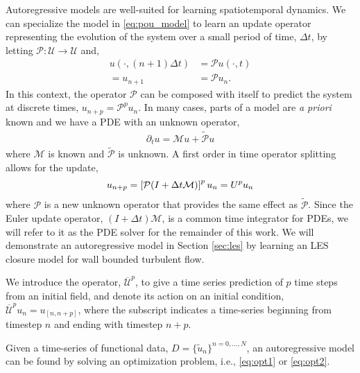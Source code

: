 Autoregressive models are well-suited for learning spatiotemporal dynamics. We can specialize the model in \eqref{eq:pou_model} to learn an update operator representing the evolution of the system over a small period of time, $\Delta t$, by letting $\mathcal{P}:\mathcal{U}\rightarrow \mathcal{U}$ and,
\begin{equation}
\begin{split}
    u(\cdot,(n+1)\Delta t) & = \mathcal{P} u(\cdot,t)\\
    = u_{n+1} &=  \mathcal{P} u_n.
\end{split}
\end{equation}
In this context, the operator $\mathcal{P}$ can be composed with itself to predict the system at discrete times, $u_{n+p} =  \mathcal{P}^p u_n$. In many cases, parts of a model are \textit{a priori} known and we have a PDE with an unknown operator,
\begin{equation}
    \begin{aligned}\label{eq:autoreg1}
        \partial_t u = \mathcal{M} u + \tilde{\mathcal{P}}u
    \end{aligned}
\end{equation}
where $\mathcal{M}$ is known and $\tilde{\mathcal{P}}$ is unknown. A first order in time operator splitting allows for the update,
\begin{equation}\label{eq:autoreg2}
        u_{n+p} = \left[ \mathcal{P}(I+\Delta t \mathcal{M})\right]^pu_n = U^pu_n\\
\end{equation}
where $\mathcal{P}$ is a new unknown operator that provides the same effect as $\tilde{\mathcal{P}}$. Since  the Euler update operator, $(I+\Delta t)\mathcal{M}$, is a common time integrator for PDEs, we will refer to it as the PDE solver for the remainder of this work.
We will demonstrate an autoregressive model in Section \ref{sec:les} by learning an LES closure model for wall bounded turbulent flow.

 We introduce the operator, $\overline{\mathcal{U}}^p$, to give a time series prediction of $p$ time steps from an initial field, and denote its action on an initial condition, $\overline{\mathcal{U}}^p u_n = u_{[n,n+p]}$, where the subscript indicates a time-series beginning from timestep $n$ and ending with timestep $n+p$.


 Given a time-series of functional data, $D = \{\tilde{u}_n\}^{n=0,\hdots,N}$, an autoregressive model can be found by solving an optimization problem, i.e., \eqref{eq:opt1} or \eqref{eq:opt2}.
 

